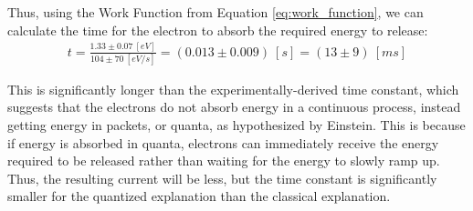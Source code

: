 Thus, using the Work Function from Equation \ref{eq:work_function}, we can calculate the time for the electron to absorb the required energy to release:
\begin{gather*}
    t = \frac{1.33 \pm 0.07~[eV]}{104 \pm 70~[eV/s]} = (0.013 \pm 0.009)~[s] = (13 \pm 9)~[ms]
\end{gather*}

This is significantly longer than the experimentally-derived time constant, which suggests that the electrons do not absorb energy in a continuous process, instead getting energy in packets, or quanta, as hypothesized by Einstein. This is because if energy is absorbed in quanta, electrons can immediately receive the energy required to be released rather than waiting for the energy to slowly ramp up. Thus, the resulting current will be less, but the time constant is significantly smaller for the quantized explanation than the classical explanation.